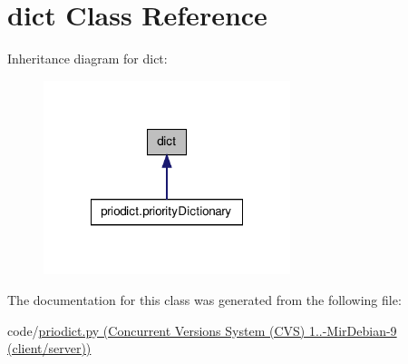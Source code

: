 \hypertarget{classdict}{\section{dict Class Reference}
\label{classdict}
}


Inheritance diagram for dict\-:\nopagebreak
\begin{figure}[H]
\begin{center}
\leavevmode
\includegraphics[width=204pt]{classdict__inherit__graph}
\end{center}
\end{figure}


The documentation for this class was generated from the following file\-:\begin{DoxyCompactItemize}
\item 
code/\hyperlink{priodict_8py}{priodict.\-py (\-Concurrent Versions System (\-C\-V\-S) 1..-\/\-Mir\-Debian-\/9 (client/server))}\end{DoxyCompactItemize}
